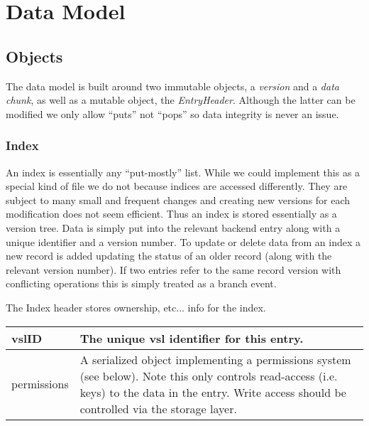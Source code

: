 \documentclass[10pt]{article}
\begin{document}
\section{Data Model}

\subsection{Objects}

The data model is built around two immutable objects, a {\em version} and a {\em
data chunk}, as well as a mutable object, the {\em EntryHeader}.  Although the latter
can be modified we only allow ``puts'' not ``pops'' so data integrity is never
an issue.

\subsubsection{Index}

An index is essentially any ``put-mostly'' list.  While we could implement this
as a special kind of file we do not because indices are accessed differently.
They are subject to many small and frequent changes and creating new versions
for each modification does not seem efficient.  Thus an index is stored
essentially as a version tree.  Data is simply put into the relevant backend
entry along with a unique identifier and a version number.  To update or delete
data from an index a new record is added updating the status of an older record
(along with the relevant version number).  If two entries refer to the same
record version with conflicting operations this is simply treated as a branch
event.

The Index header stores ownership, etc... info for the index.
\begin{tabular}{|l|p{12cm}|}
\hline
vslID & The unique vsl identifier for this entry.\\
\hline
permissions & A serialized object implementing a permissions system (see below).
Note this only controls read-access (i.e. keys) to the data in the entry.  Write
access should be controlled via the storage layer. \\
\hline
\end{tabular}
\end{document}
